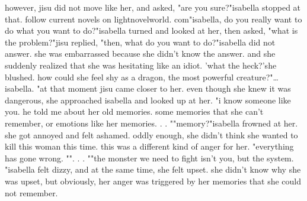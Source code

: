 however, jisu did not move like her, and asked, "are you sure?"isabella stopped at that.
 follow current novels on lightnovelworld.
c‌om"isabella, do you really want to do what you want to do?"isabella turned and looked at her, then asked, "what is the problem?"jisu replied, "then, what do you want to do?"isabella did not answer.
 she was embarrassed because she didn't know the answer.
 and she suddenly realized that she was hesitating like an idiot.
'what the heck?'she blushed.
 how could she feel shy as a dragon, the most powerful creature?"…isabella.
"at that moment jisu came closer to her.
 even though she knew it was dangerous, she approached isabella and looked up at her.
"i know someone like you.
 he told me about her old memories.
 some memories that she can't remember, or emotions like her memories.
.
.
""memory?"isabella frowned at her.
 she got annoyed and felt ashamed.
oddly enough, she didn't think she wanted to kill this woman this time.
 this was a different kind of anger for her.
 "everything has gone wrong.
"".
.
.
""the monster we need to fight isn't you, but the system.
"isabella felt dizzy, and at the same time, she felt upset.
 she didn't know why she was upset, but obviously, her anger was triggered by her memories that she could not remember.

